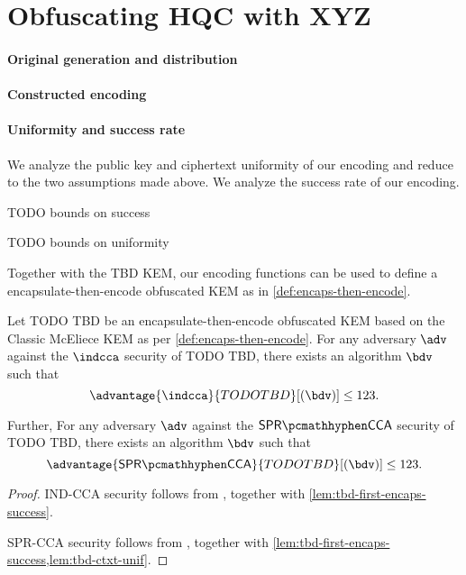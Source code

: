 \section{Obfuscating HQC with XYZ} \label{sec:tbd}
\paragraph{Original generation and distribution}
\paragraph{Constructed encoding}
\paragraph{Uniformity and success rate}

We analyze the public key and ciphertext uniformity of our encoding and reduce to the two assumptions made above. We analyze the success rate of our encoding.

\begin{lemma}[[First-encaps Success Probability of TODO TBD]
\label{lem:tbd-first-encaps-success}
    TODO bounds on success
\end{lemma}

\begin{lemma}
\label{lem:tbd-ctxt-unif}
    TODO bounds on uniformity
\end{lemma}

Together with the TBD KEM, our encoding functions can be used to define a encapsulate-then-encode obfuscated KEM as in \cref{def:encaps-then-encode}.

\begin{theorem}
    Let TODO TBD be an encapsulate-then-encode obfuscated KEM based on the Classic McEliece KEM as per \cref{def:encaps-then-encode}. For any adversary $\adv$ against the $\indcca$ security of TODO TBD, there exists an algorithm $\bdv$ such that
    \[ \advantage{\indcca}{TODO TBD}[(\bdv)] \leq 123. \]

    Further,  For any adversary $\adv$ against the $\sprcca$ security of TODO TBD, there exists an algorithm $\bdv$ such that
    \[ \advantage{\sprcca}{TODO TBD}[(\bdv)] \leq 123. \]
\end{theorem}
\begin{proof}
    IND-CCA security follows from \cite[Theorem~2.12]{CCS:GunSteVei24}, together with \cref{lem:tbd-first-encaps-success}.
    
    SPR-CCA security follows from \cite[Theorem~2.13]{CCS:GunSteVei24}, together with \cref{lem:tbd-first-encaps-success,lem:tbd-ctxt-unif}.
\end{proof}